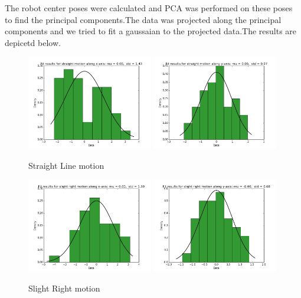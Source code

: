 \documentclass[10pt]{scrartcl}
\begin{document}
The robot center poses were calculated and PCA was performed on these poses to find the principal components.The data was projected along the principal components and we tried to fit a gaussaian to the projected data.The results are depicetd below.

\begin{figure}[H]
\centering
\caption{Straight Line motion}
\label{fig:11}
\includegraphics[width=0.49\textwidth ]{images/pca_straight_x_data}
\includegraphics[width=0.49\textwidth]{images/pca_straight_y_data}
\end{figure}

\begin{figure}[H]
\centering
\caption{Slight Right motion}
\label{fig:12}
\includegraphics[width=0.49\textwidth ]{images/pca_slight_right_x_data}
\includegraphics[width=0.49\textwidth]{images/pca_slight_right_y_data}
\end{figure}
\end{document}
